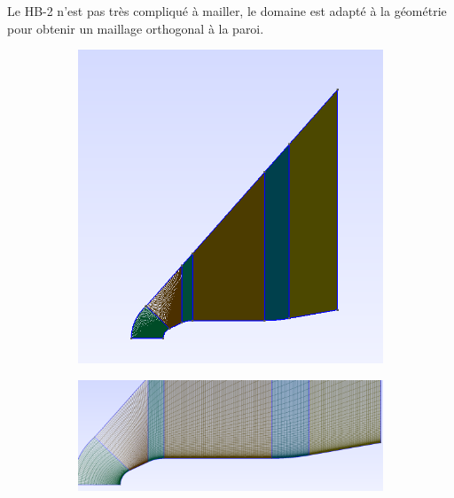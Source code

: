 Le HB-2 n'est pas très compliqué à mailler,  le domaine est adapté à la géométrie pour obtenir un maillage orthogonal à la paroi.


\begin{figure}[H]
\begin{center}
\begin{subfigure}{0.5\textwidth}
\includegraphics[width=\textwidth]{chapter1_introduction/pictures/gmsh/hb2_mesh1.png}
\end{subfigure}
\begin{subfigure}{0.5\textwidth}
\includegraphics[width=\textwidth]{chapter1_introduction/pictures/gmsh/hb2_mesh2.png}
\end{subfigure}
\begin{subfigure}{0.5\textwidth}

\end{subfigure}
\end{center}
\end{figure}
